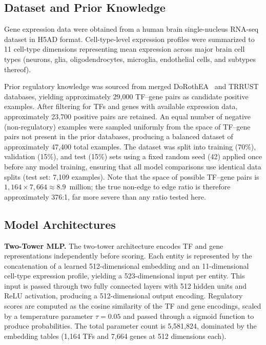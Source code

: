 \documentclass[journal]{IEEEtran}
\begin{document}
\subsection{Dataset and Prior Knowledge}
\label{ssec:data}

Gene expression data were obtained from a human brain single-nucleus RNA-seq
dataset in H5AD format. Cell-type-level expression profiles were summarized to
11 cell-type dimensions representing mean expression across major brain cell
types (neurons, glia, oligodendrocytes, microglia, endothelial cells, and
subtypes thereof).

Prior regulatory knowledge was sourced from merged DoRothEA~\cite{garcia2019}
and TRRUST~\cite{han2018} databases, yielding approximately 29,000 TF--gene
pairs as candidate positive examples. After filtering for TFs and genes with
available expression data, approximately 23,700 positive pairs are retained.
An equal number of negative (non-regulatory) examples were sampled uniformly
from the space of TF--gene pairs not present in the prior databases, producing
a balanced dataset of approximately 47,400 total examples. The dataset was
split into training (70\%), validation (15\%), and test (15\%) sets using a
fixed random seed (42) applied once before any model training, ensuring that
all model comparisons use identical data splits (test set: 7,109 examples).
Note that the space of possible TF--gene pairs is $1{,}164 \times 7{,}664
\approx 8.9$~million; the true non-edge to edge ratio is therefore
approximately 376:1, far more severe than any ratio tested here.

\subsection{Model Architectures}
\label{ssec:arch}

\textbf{Two-Tower MLP.} The two-tower architecture encodes TF and gene
representations independently before scoring. Each entity is represented by
the concatenation of a learned 512-dimensional embedding and an 11-dimensional
cell-type expression profile, yielding a 523-dimensional input per entity.
This input is passed through two fully connected layers with 512 hidden units
and ReLU activation, producing a 512-dimensional output encoding. Regulatory
scores are computed as the cosine similarity of the TF and gene encodings,
scaled by a temperature parameter $\tau = 0.05$ and passed through a sigmoid
function to produce probabilities. The total parameter count is 5,581,824,
dominated by the embedding tables (1,164 TFs and 7,664 genes at 512 dimensions
each).
\end{document}
